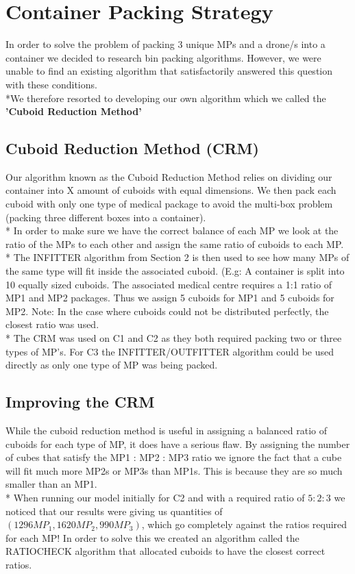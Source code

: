 \documentclass[a4paper,12pt]{article}
\begin{document}
\section{Container Packing Strategy}
In order to solve the problem of packing 3 unique MPs and a drone/s into a container we decided to research bin packing algorithms.
However, we were unable to find an existing algorithm that satisfactorily answered this question with these conditions.
\\*We therefore resorted to developing our own algorithm which we called the \bf{'Cuboid Reduction Method'} 

\subsection{Cuboid Reduction Method (CRM)}
Our algorithm known as the Cuboid Reduction Method relies on dividing our container into X amount of cuboids with equal dimensions. We then pack each cuboid with only one
type of medical package to avoid the multi-box problem (packing three different boxes into a container).\\* In order to make sure we have the correct balance of each MP we
look at the ratio of the MPs to each other and assign the same ratio of cuboids to each MP.\\*
The INFITTER algorithm from Section 2 is then used to see how many MPs of the same type will fit inside the associated cuboid.
(E.g: A container is split into 10 equally sized cuboids. The associated medical centre requires a 1:1 ratio of MP1 and MP2 packages. Thus we assign 5 cuboids for MP1 and 5 cuboids for MP2.
Note: In the case where cuboids could not be distributed perfectly, the closest ratio was used.
\\*
The CRM was used on C1 and C2 as they both required packing two or three types of MP's. For C3 the INFITTER/OUTFITTER algorithm could be used directly as only one type of MP was being packed.

\subsection{Improving the CRM}
While the cuboid reduction method is useful in assigning a balanced ratio of cuboids for each type of MP, it does have a serious flaw. By assigning the number of cubes that satisfy the MP1 : MP2 : MP3
ratio we ignore the fact that a cube will fit much more MP2s or MP3s than MP1s. This is because they are so much smaller than an MP1.\\*
When running our model initially for C2 and with a required ratio of $5:2:3$  we noticed that our results were giving us quantities of $(1296MP_1, 1620MP_2,990MP_3)$, which go completely against the ratios required for each MP!
In order to solve this we created an algorithm called the RATIOCHECK algorithm that allocated cuboids to have the closest correct ratios.
\end{document}
